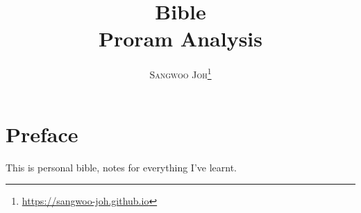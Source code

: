 \documentclass[12pt, a4paper, oneside]{book}
\title{
  \Huge \textbf{Bible}
  \\
  \huge {Proram Analysis}
}
\author{\textsc{Sangwoo Joh}\footnote{\url{https://sangwoo-joh.github.io}}}
\begin{document}
\frontmatter
\maketitle

\tableofcontents  %
\listoffigures  %
\listoftables   %

\mainmatter


\chapter*{Preface}
This is personal bible, notes for everything I've learnt.









\end{document}
